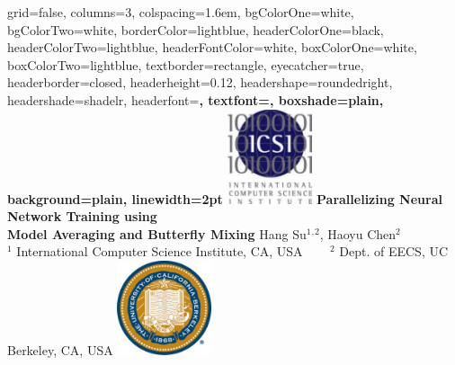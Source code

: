 \documentclass[landscape,final,archE1,fontscale=0.35]{baposter}
\begin{document}


\begin{poster}%
  {
  grid=false,
  columns=3,
  colspacing=1.6em,
  bgColorOne=white,
  bgColorTwo=white,
  borderColor=lightblue,
  headerColorOne=black,
  headerColorTwo=lightblue,
  headerFontColor=white,
  boxColorOne=white,
  boxColorTwo=lightblue,
  textborder=rectangle,
  eyecatcher=true,
  headerborder=closed,
  headerheight=0.12\textheight,
  headershape=roundedright,
  headershade=shadelr,
  headerfont=\Large\bf, %
  textfont={\setlength{\parindent}{1.5em}},
  boxshade=plain,
  background=plain,
  linewidth=2pt
  }
  {\includegraphics[height=7.5em]{images/ICSI_color}}
  {\bf{Parallelizing Neural Network Training using \\Model Averaging and Butterfly Mixing}}
  {Hang Su$^1$$^,$$^2$, Haoyu Chen$^2$\\
  $^1$ International Computer Science Institute, CA, USA ~~~ $^2$ Dept. of EECS, UC Berkeley, CA, USA }
  {%
    \includegraphics[height=7.5em]{images/ucbseal}
  }


\end{poster}
\end{document}
